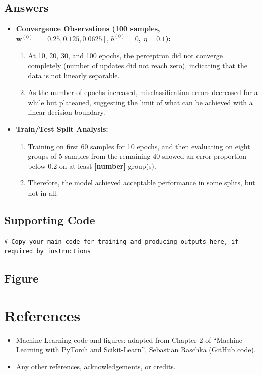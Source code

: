 \documentclass[11pt]{article}
\begin{document}
\subsection{Answers}
\begin{itemize}
    \item \textbf{Convergence Observations (100 samples, $\mathbf{w}^{(0)} = [0.25, 0.125, 0.0625],\, b^{(0)}=0$, $\eta=0.1$):}
    \begin{enumerate}
        \item At 10, 20, 30, and 100 epochs, the perceptron did not converge completely (number of updates did not reach zero), indicating that the data is not linearly separable. 
        \item As the number of epochs increased, misclassification errors decreased for a while but plateaued, suggesting the limit of what can be achieved with a linear decision boundary.
    \end{enumerate}
    
    \item \textbf{Train/Test Split Analysis:}
    \begin{enumerate}
        \item Training on first 60 samples for 10 epochs, and then evaluating on eight groups of 5 samples from the remaining 40 showed an error proportion below 0.2 on at least \textbf{[number]} group(s).
        \item Therefore, the model achieved acceptable performance in some splits, but not in all.
    \end{enumerate}
\end{itemize}

\subsection{Supporting Code}
\begin{verbatim}
# Copy your main code for training and producing outputs here, if required by instructions
\end{verbatim}

\subsection{Figure}

\newpage


\section*{References}
\begin{itemize}
    \item Machine Learning code and figures: adapted from Chapter 2 of ``Machine Learning with PyTorch and Scikit-Learn'', Sebastian Raschka (GitHub code).
    \item Any other references, acknowledgements, or credits.
\end{itemize}
\end{document}

